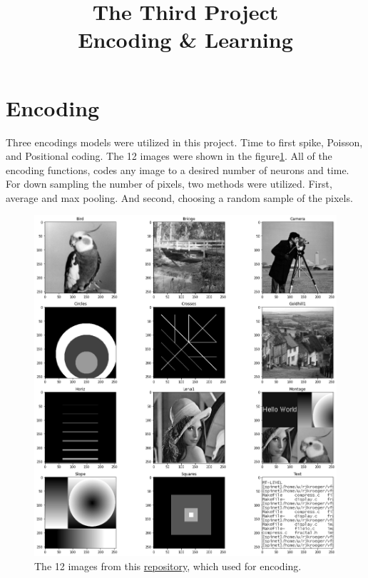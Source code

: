 \documentclass{article}
\title{The Third Project\\\large Encoding \& Learning}
\begin{document}
	\maketitle
	\section{Encoding}
	Three encodings models were utilized in this project. Time to first spike, Poisson, and Positional coding. The 12 images were shown in the figure\ref{im}. All of the encoding functions, codes any image to a desired number of neurons and time. For down sampling the number of pixels, two methods were utilized. First, average and max pooling. And second, choosing a random sample of the pixels. 
	
	\begin{figure}[h]
		\includegraphics[width=1.2\textwidth]{images.png}
		\caption{The 12 images from this \href{https://links.uwaterloo.ca/Repository.html}{repository}, which used for encoding.}
		\label{im}
	\end{figure}
\end{document}
